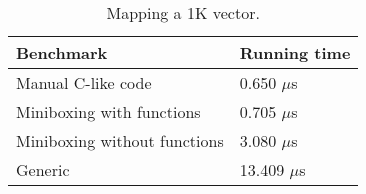 \begin{table}[t]
  \begin{tabularx}{0.48\textwidth}{|g *{1}{|Y}|} \hline
    \textbf{Benchmark}             &  \textbf{Running time} \\ \hline
    Manual C-like code             &         0.650 $\mu$s \\
    Miniboxing with functions      &         0.705 $\mu$s \\
    Miniboxing without functions   &         3.080 $\mu$s \\
    Generic                        &        13.409 $\mu$s \\ \hline
  \end{tabularx}
  \vspace{-2mm}
  \caption{Mapping a 1K vector.}
  \label{table:framian}
  \vspace{-1em}
\end{table}

